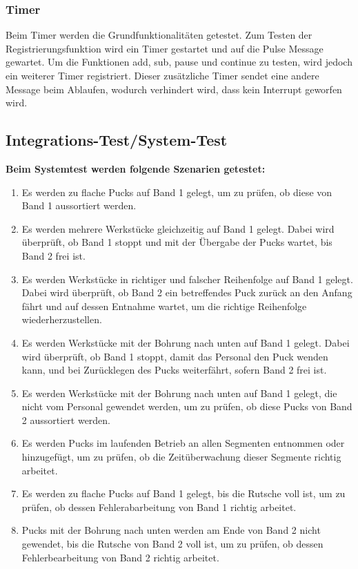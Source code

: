 \documentclass[oneside,a4paper,titlepage]{scrartcl}              %
\begin{document}
\subsubsection{Timer}
Beim Timer werden die Grundfunktionalitäten getestet.\newline
Zum Testen der Registrierungsfunktion wird ein Timer gestartet und auf die Pulse Message gewartet.\newline
Um die Funktionen add, sub, pause und continue zu testen, wird jedoch ein weiterer Timer registriert.
Dieser zusätzliche Timer sendet eine andere Message beim Ablaufen, wodurch verhindert wird, dass kein Interrupt
geworfen wird.

\newpage

\subsection{Integrations-Test/System-Test}
\textbf{Beim Systemtest werden folgende Szenarien getestet:}
\begin{enumerate}
  \item Es werden zu flache Pucks auf Band 1 gelegt, um zu prüfen, ob diese von Band 1 aussortiert werden.
  \item Es werden mehrere Werkstücke gleichzeitig auf Band 1 gelegt. Dabei wird überprüft, ob Band 1 stoppt und mit der Übergabe der Pucks wartet, bis Band 2 frei ist.
  \item Es werden Werkstücke in richtiger und falscher Reihenfolge auf Band 1 gelegt. Dabei wird überprüft, ob Band 2 ein betreffendes Puck zurück an den Anfang fährt und auf dessen Entnahme wartet, um die richtige Reihenfolge wiederherzustellen.
  \item Es werden Werkstücke mit der Bohrung nach unten auf Band 1 gelegt. Dabei wird überprüft, ob Band 1 stoppt, damit das Personal den Puck wenden kann, und bei Zurücklegen des Pucks weiterfährt, sofern Band 2 frei ist.
  \item Es werden Werkstücke mit der Bohrung nach unten auf Band 1 gelegt, die nicht vom Personal gewendet werden, um zu prüfen, ob diese Pucks von Band 2 aussortiert werden.
  \item Es werden Pucks im laufenden Betrieb an allen Segmenten entnommen oder hinzugefügt, um zu prüfen, ob die Zeitüberwachung dieser Segmente richtig arbeitet.
  \item Es werden zu flache Pucks auf Band 1 gelegt, bis die Rutsche voll ist, um zu prüfen, ob dessen Fehlerabarbeitung von Band 1 richtig arbeitet.
  \item Pucks mit der Bohrung nach unten werden am Ende von Band 2 nicht gewendet, bis die Rutsche von Band 2 voll ist, um zu prüfen, ob dessen Fehlerbearbeitung von Band 2 richtig arbeitet.
\end{enumerate}
\end{document}
